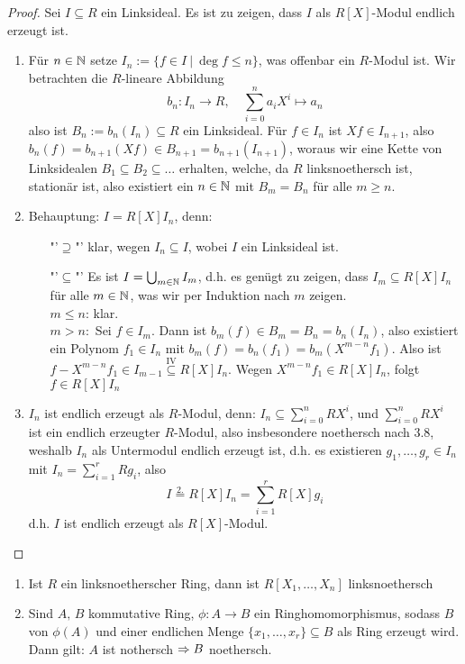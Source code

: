 \begin{proof}
	Sei $I\subseteq R$ ein Linksideal. Es ist zu zeigen, dass $I$ als $R[X]$-Modul endlich erzeugt ist.
	\begin{enumerate}
		\item Für $n\in \mathbb{N}$ setze $I_n:= \{f\in I \ | \ \deg f \leq n\}$, was offenbar ein $R$-Modul ist. Wir betrachten die $R$-lineare Abbildung 
		$$b_n : I_n \longrightarrow R, \quad \sum_{i=0}^n a_i X^i \mapsto a_n$$
		also ist $B_n:= b_n(I_n) \subseteq R$ ein Linksideal. Für $f\in I_n$ ist $Xf\in I_{n+1}$, also $b_n(f) = b_{n+1}(Xf) \in B_{n+1} = b_{n+1}(I_{n+1})$, woraus wir eine Kette von Linksidealen $B_1 \subseteq B_2 \subseteq \ldots$ erhalten, welche, da $R$ linksnoethersch ist, stationär ist, also existiert ein $n\in \mathbb{N}$ mit $B_m = B_n$ für alle $m\geq n$.
		\item Behauptung: $I = R[X] I_n$, denn: 
		\begin{enumerate}
			\item["'$\supseteq$"']  klar, wegen $I_n\subseteq I$, wobei $I$ ein Linksideal ist.
			\item["'$\subseteq$"'] Es ist $I = \bigcup_{m\in \mathbb{N}} I_m$, d.h. es genügt zu zeigen, dass $I_m \subseteq R[X] I_n$ für alle $m\in \mathbb{N}$, was wir per Induktion nach $m$ zeigen. \\
			$m\leq n$: klar.\\
			$m >n:$ Sei $f\in I_m$. Dann ist $b_m(f) \in B_m  = B_n = b_n(I_n)$, also existiert ein Polynom $f_1\in I_n$ mit $b_m(f) = b_n(f_1)= b_m(X^{m-n}f_1)$. Also ist $f- X^{m-n} f_1 \in I_{m-1} \overset{\text{IV}}{\subseteq } R[X] I_n$. Wegen $X^{m-n} f_1 \in R[X] I_n$, folgt $f\in R[X] I_n$
		\end{enumerate}
	\item $I_n$ ist endlich erzeugt als $R$-Modul, denn: $I_n \subseteq \sum_{i=0}^n RX^i$, und $\sum_{i=0}^n RX^i$ ist ein endlich erzeugter $R$-Modul, also insbesondere noethersch nach 3.8, weshalb $I_n$ als Untermodul endlich erzeugt ist, d.h. es existieren $g_1, \ldots, g_r\in I_n $ mit $I_n = \sum_{i=1}^r Rg_i$, also 
	$$I \overset{2.}{=} R[X]I_n = \sum_{i=1}^r R[X] g_i $$
	d.h. $I$ ist endlich erzeugt als $R[X]$-Modul.
	\end{enumerate}
\end{proof}
\begin{fo}\label{fo2.13}
	\begin{enumerate}[label= \alph*)]
		\item Ist $R$ ein linksnoetherscher Ring, dann ist $R[X_1, \ldots, X_n]$ linksnoethersch
		\item Sind $A,\, B$ kommutative Ring, $\phi:A \to B$ ein Ringhomomorphismus, sodass $B$ von $\phi(A)$ und einer endlichen Menge $\{x_1, \ldots, x_r\}\subseteq B$ als Ring erzeugt wird. Dann gilt: $A$ ist nothersch $\Rightarrow B$ noethersch.
	\end{enumerate}
\end{fo}
